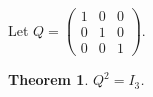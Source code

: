 \documentclass{article}
\newtheorem{theorem}{Theorem}
\begin{document}
Let $Q=\begin{pmatrix}1&0&0\\0&1&0\\0&0&1\end{pmatrix}$.
\begin{theorem}\label{thm:heldout}
$Q^2=I_3$.
\end{theorem}
\end{document}
